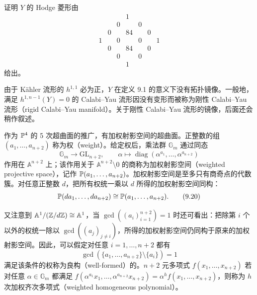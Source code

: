 \begin{exercise}
证明 $Y$ 的 Hodge 菱形由
\begin{equation}
  \begin{array}{ccccccc}
    & & & 1 & & & \\
    & & 0 & & 0 & & \\
    & 0 & & 84 & & 0 & \\
    1 & & 0 & & 0 & & 1\\
    & 0 & & 84 & & 0 & \\
    & & 0 & & 0 & & \\
    & & & 1 & & &
  \end{array}
  \tag{9.18}
\end{equation}
给出。
\end{exercise}

由于 Kähler 流形的 $h^{1,1}$ 必为正，$Y$ 在定义 9.1 的意义下没有拓扑镜像。一般地，满足 $h^{1,n-1}(Y)=0$ 的 Calabi--Yau 流形因没有变形而被称为刚性 Calabi--Yau 流形（rigid Calabi--Yau manifold）。关于刚性 Calabi--Yau 流形的镜像，后面还会稍作叙述。

作为 $\mathbb{P}^4$ 的 5 次超曲面的推广，有加权射影空间的超曲面。正整数的组 $(a_1,\ldots,a_{n+2})$ 称为权（weight）。给定权后，乘法群 $\mathbb{G}_m$ 通过同态
\begin{equation}
  \mathbb{G}_m\to \mathrm{GL}_{n+2},\qquad \alpha\mapsto\operatorname{diag}(\alpha^{a_1},\ldots,\alpha^{a_{n+2}})
  \tag{9.19}
\end{equation}
作用在 $\mathbb{A}^{n+2}$ 上；该作用关于 $\mathbb{A}^{n+2}\setminus 0$ 的商称为加权射影空间（weighted projective space），记作 $\mathbb{P}(a_1,\ldots,a_{n+2})$。加权射影空间是至多只有商奇点的代数簇。对任意正整数 $d$，把所有权统一乘以 $d$ 所得的加权射影空间同构：
\begin{equation}
  \mathbb{P}(da_1,\ldots,da_{n+2})\cong\mathbb{P}(a_1,\ldots,a_{n+2}).
  \tag{9.20}
\end{equation}

又注意到 $\mathbb{A}^1/(\mathbb{Z}/d\mathbb{Z})\cong\mathbb{A}^1$，当 $\gcd\left((a_i)_{i=1}^{n+2}\right)=1$ 时还可看出：把除第 $i$ 个以外的权统一除以 $\gcd\left((a_j)_{j\ne i}\right)$，所得的加权射影空间仍同构于原来的加权射影空间。因此，可以假定对任意 $i=1,\ldots,n+2$ 都有
\begin{equation}
  \gcd\left(\{a_1,\ldots,a_{n+2}\}\setminus\{a_i\}\right)=1
  \tag{9.21}
\end{equation}
满足该条件的权称为良构（well-formed）的。$n+2$ 元多项式 $f(x_1,\ldots,x_{n+2})$ 若对任意 $\alpha\in\mathbb{G}_m$ 都满足 $f(\alpha^{a_1}x_1,\ldots,\alpha^{a_{n+2}}x_{n+2})=\alpha^hf(x_1,\ldots,x_{n+2})$，则称为 $h$ 次加权齐次多项式（weighted homogeneous polynomial）。

